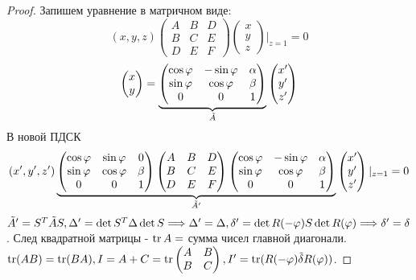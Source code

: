 \begin{proof}
	Запишем уравнение в матричном виде: 
	\[(x,y,z)\begin{pmatrix}
		A & B & D \\
		B & C & E \\
		D & E & F
	\end{pmatrix}\begin{pmatrix}
	x \\ y \\ z
	\end{pmatrix}|_{z = 1} = 0\]
	\[\begin{pmatrix}
		x \\ y
	\end{pmatrix} = \underbrace{\begin{pmatrix}
	\cos\phi & -\sin\phi & \alpha \\
	\sin\phi & \cos\phi & \beta \\
	0 & 0 & 1
	\end{pmatrix}}_{\Tilde{A}}\begin{pmatrix}
	x' \\ y' \\ z'
\end{pmatrix}\]
В новой ПДСК 
\[(x', y', z')\underbrace{\begin{pmatrix}
	\cos\phi & \sin\phi & 0 \\
	\sin\phi & \cos\phi & \beta \\
	0 & 0 & 1
\end{pmatrix}\begin{pmatrix}
A & B & D \\ B & C & E \\ D & E & F
\end{pmatrix}\begin{pmatrix}
\cos\phi & -\sin\phi & \alpha \\
\sin\phi & \cos\phi & \beta \\
0 & 0 & 1
\end{pmatrix}}_{\Tilde{A}'}\begin{pmatrix}
x' \\ y' \\ z'
\end{pmatrix}|_{z= 1} = 0\]
\(\Tilde{A}' = S^T\Tilde{A}S, \Delta' = \det S^T\Delta\det S \Longrightarrow \Delta' = \Delta, \delta' = \det R(-\phi)S\det R(\phi)\Longrightarrow \delta' = \delta\). След квадратной матрицы - \(\tr A = \) сумма чисел главной диагонали. \(\tr (AB) = \tr(BA), I = A + C = \tr\begin{pmatrix}
	A & B \\ B & C
\end{pmatrix}, I' = \tr(R(-\phi)\Tilde{\delta}R(\phi))\).
\end{proof}

